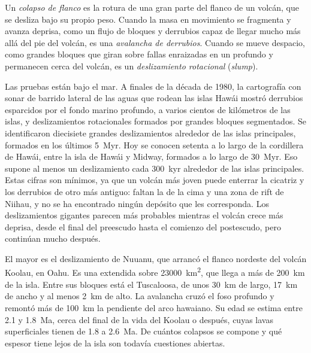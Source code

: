 \begin{definition}\label{def:b2:oceanic-islands:collapse}
Un \emph{colapso de flanco} es la rotura de una gran parte del flanco de un
volcán, que se desliza bajo su propio peso. Cuando la masa en movimiento se fragmenta y avanza
deprisa, como un flujo de bloques y derrubios capaz de llegar mucho más allá del pie del volcán, es una
\emph{avalancha de derrubios}. Cuando se mueve despacio, como grandes bloques que giran
sobre fallas enraizadas en un  profundo y permanecen cerca del volcán, es un \emph{deslizamiento rotacional} (\textit{slump}).
\end{definition}

Las pruebas están bajo el mar. A finales de la década de 1980, la cartografía con sonar de barrido lateral de las aguas que rodean
las islas Hawái mostró derrubios esparcidos por el fondo marino profundo, a varios cientos de kilómetros de
las islas, y deslizamientos rotacionales formados por grandes bloques segmentados. Se identificaron diecisiete grandes deslizamientos
alrededor de las islas principales, formados en los últimos \qty{5}{Myr}. Hoy se conocen setenta a lo largo de la
cordillera de Hawái, entre la isla de Hawái y Midway, formados a lo largo de \qty{30}{Myr}. Eso supone al
menos un deslizamiento cada \qty{300}{kyr} alrededor de las islas principales. Estas cifras son mínimos, ya que un
volcán más joven puede enterrar la cicatriz y los derrubios de otro más antiguo: faltan la  de la cima y una zona de rift
de Niihau, y no se ha encontrado ningún depósito que les corresponda. Los deslizamientos gigantes parecen más probables mientras el
volcán crece más deprisa, desde el final del preescudo hasta el comienzo del postescudo, pero continúan
mucho después.

El mayor es el deslizamiento de Nuuanu, que arrancó el flanco nordeste del volcán
Koolau, en Oahu. Es una  extendida sobre \qty{23000}{km^2}, que llega a más de
\qty{200}{km} de la isla. Entre sus bloques está el  Tuscaloosa, de unos \qty{30}{km} de largo,
\qty{17}{km} de ancho y al menos \qty{2}{km} de alto. La avalancha cruzó el foso profundo y remontó
más de \qty{100}{km} la pendiente del arco hawaiano. Su edad se estima entre 2.1 y
\qty{1.8}{Ma}, cerca del final de la vida del Koolau o después, cuyas lavas superficiales tienen de 1.8 a
\qty{2.6}{Ma}. De cuántos colapsos se compone y qué espesor tiene lejos de la isla
son todavía cuestiones abiertas.

